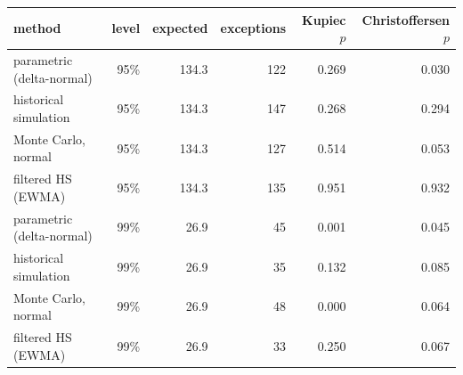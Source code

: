 \begin{tabular}{lrrrrr}
\toprule
method & level & expected & exceptions & Kupiec $p$ & Christoffersen $p$ \\
\midrule
parametric (delta-normal) & 95\% & 134.3 & 122 & 0.269 & 0.030 \\
historical simulation & 95\% & 134.3 & 147 & 0.268 & 0.294 \\
Monte Carlo, normal & 95\% & 134.3 & 127 & 0.514 & 0.053 \\
filtered HS (EWMA) & 95\% & 134.3 & 135 & 0.951 & 0.932 \\
parametric (delta-normal) & 99\% & 26.9 & 45 & 0.001 & 0.045 \\
historical simulation & 99\% & 26.9 & 35 & 0.132 & 0.085 \\
Monte Carlo, normal & 99\% & 26.9 & 48 & 0.000 & 0.064 \\
filtered HS (EWMA) & 99\% & 26.9 & 33 & 0.250 & 0.067 \\
\bottomrule
\end{tabular}
